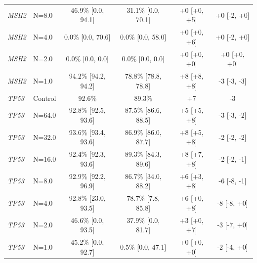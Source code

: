 \begin{tabular}{llcccc}
\textit{MSH2} & N=8.0 & 46.9\% [0.0, 94.1] & 31.1\% [0.0, 70.1] & +0 [+0, +5] & +0 [-2, +0] \\
\textit{MSH2} & N=4.0 & 0.0\% [0.0, 70.6] & 0.0\% [0.0, 58.0] & +0 [+0, +6] & +0 [-2, +0] \\
\textit{MSH2} & N=2.0 & 0.0\% [0.0, 0.0] & 0.0\% [0.0, 0.0] & +0 [+0, +0] & +0 [+0, +0] \\
\textit{MSH2} & N=1.0 & 94.2\% [94.2, 94.2] & 78.8\% [78.8, 78.8] & +8 [+8, +8] & -3 [-3, -3] \\
\midrule
\textit{TP53} & Control & 92.6\% & 89.3\% & +7 & -3 \\
\textit{TP53} & N=64.0 & 92.8\% [92.5, 93.6] & 87.5\% [86.6, 88.5] & +5 [+5, +8] & -3 [-3, -2] \\
\textit{TP53} & N=32.0 & 93.6\% [93.4, 93.6] & 86.9\% [86.0, 87.7] & +8 [+5, +8] & -2 [-2, -2] \\
\textit{TP53} & N=16.0 & 92.4\% [92.3, 93.6] & 89.3\% [84.3, 89.6] & +8 [+7, +8] & -2 [-2, -1] \\
\textit{TP53} & N=8.0 & 92.9\% [92.2, 96.9] & 86.7\% [34.0, 88.2] & +6 [+3, +8] & -6 [-8, -1] \\
\textit{TP53} & N=4.0 & 92.8\% [23.0, 93.5] & 78.7\% [7.8, 85.8] & +6 [+0, +8] & -8 [-8, +0] \\
\textit{TP53} & N=2.0 & 46.6\% [0.0, 93.5] & 37.9\% [0.0, 81.7] & +3 [+0, +7] & -3 [-7, +0] \\
\textit{TP53} & N=1.0 & 45.2\% [0.0, 92.7] & 0.5\% [0.0, 47.1] & +0 [+0, +0] & -2 [-4, +0] \\
\bottomrule
\end{tabular}
